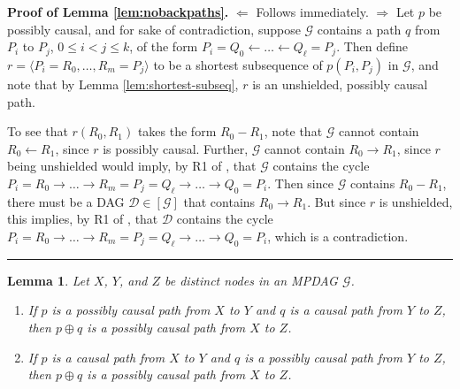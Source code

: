 \documentclass[11pt]{article}
\newcommand{\BlackBox}{\rule{1.5ex}{1.5ex}}  %
\newtheorem{lemma}[theorem]{Lemma}
\newcommand{\g}[1][G]{\mathcal{#1}}
\newenvironment{proofof}[1][]{\noindent \textbf{Proof of #1.}}{\hfill\BlackBox}
\begin{document}
\begin{proofof}[Lemma \ref{lem:nobackpaths}]
    $\Leftarrow$ Follows immediately.
    $\Rightarrow$ Let $p$ be possibly causal, and for sake of contradiction, suppose $\g$ contains a path $q$ from $P_i$ to $P_j$, $0 \le i < j \le k$, of the form $P_i=Q_0 \gets \dots \gets Q_{\ell} =P_j$. Then define $r=\langle P_i = R_0, \dots, R_m= P_j\rangle$ to be a shortest subsequence of $p(P_i,P_j)$ in $\g$, and note that by Lemma \ref{lem:shortest-subseq}, $r$ is an unshielded, possibly causal path.

    To see that $r(R_0, R_1)$ takes the form $R_0 - R_1$, note that $\g$ cannot contain $R_0 \gets R_1$, since $r$ is possibly causal. Further, $\g$ cannot contain $R_0 \to R_1$, since $r$ being unshielded would imply, by R1 of \cite{meek1995causal}, that $\g$ contains the cycle $P_i= R_0 \to \dots \to R_m=P_j=Q_{\ell} \to \dots \to Q_0=P_i$. Then since $\g$ contains $R_0 - R_1$, there must be a DAG $\g[D] \in [\g]$ that contains $R_0 \to R_1$. But since $r$ is unshielded, this implies, by R1 of \cite{meek1995causal}, that $\g[D]$ contains the cycle $P_i= R_0 \to \dots \to R_m=P_j=Q_{\ell} \to \dots \to Q_0=P_i$, which is a contradiction.
\end{proofof}


\begin{lemma}
\label{lem:concat}
    Let $X$, $Y$, and $Z$ be distinct nodes in an MPDAG $\g$.
    \begin{enumerate}[label=(\roman*)]
        \item \label{lem:concat-pc-c} 
        If $p$ is a possibly causal path from $X$ to $Y$ and $q$ is a causal path from $Y$ to $Z$, then $p \oplus q$ is a possibly causal path from $X$ to $Z$.

        \item \label{lem:concat-c-pc} 
        If $p$ is a causal path from $X$ to $Y$ and $q$ is a possibly causal path from $Y$ to $Z$, then $p \oplus q$ is a possibly causal path from $X$ to $Z$.
    \end{enumerate}
\end{lemma}
\end{document}
